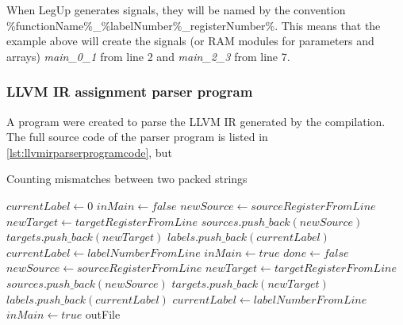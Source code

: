 When LegUp generates signals, they will be named by the convention \%functionName\%\_\%labelNumber\%\_registerNumber\%. This means that the example above will create the signals (or RAM modules for parameters and arrays) \textit{main\_0\_1} from line 2 and \textit{main\_2\_3} from line 7.
\subsubsection{LLVM IR assignment parser program}
A program were created to parse the LLVM IR generated by the compilation. The full source code of the parser program is listed in \ref{lst:llvmirparserprogramcode}, but 

\begin{algorithm}
  \caption{Counting mismatches between two packed strings
  \label{alg:packed-dna-hamming}}
  \begin{algorithmic}[1]
    \Statex
    \State $currentLabel \leftarrow 0$
    \State $inMain \leftarrow false$
            \State $newSource \leftarrow sourceRegisterFromLine$
            \State $newTarget \leftarrow targetRegisterFromLine$
            \State $sources.push\_back(newSource)$
            \State $targets.push\_back(newTarget)$
            \State $labels.push\_back(currentLabel)$
            \State $currentLabel \leftarrow labelNumberFromLine$
          \EndIf
          \State $inMain \leftarrow true$
        \EndIf
      \EndWhile
    \EndIf
    \State $done \leftarrow false$
            \State $newSource \leftarrow sourceRegisterFromLine$
            \State $newTarget \leftarrow targetRegisterFromLine$
            \State $sources.push\_back(newSource)$
            \State $targets.push\_back(newTarget)$
            \State $labels.push\_back(currentLabel)$
            \State $currentLabel \leftarrow labelNumberFromLine$
          \EndIf
          \State $inMain \leftarrow true$
        \EndIf
      \EndWhile
    \EndIf
      \State outFile
      \State {}
  \end{algorithmic}
\end{algorithm}
